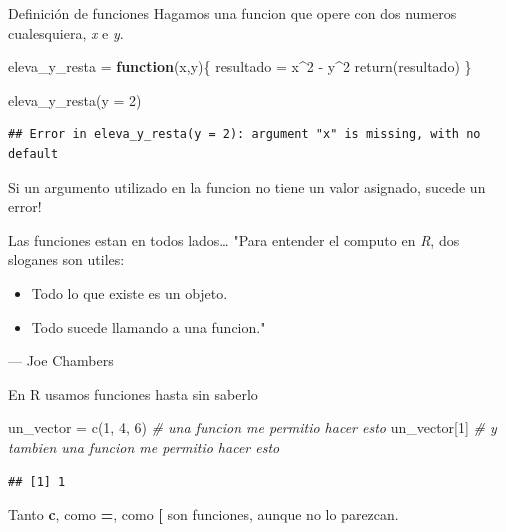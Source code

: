 \documentclass[
  10pt,
  ignorenonframetext,
]{beamer}
\newenvironment{Shaded}{\begin{snugshade}}{\end{snugshade}}
\newcommand{\AttributeTok}[1]{\textcolor[rgb]{0.77,0.63,0.00}{#1}}
\newcommand{\CommentTok}[1]{\textcolor[rgb]{0.56,0.35,0.01}{\textit{#1}}}
\newcommand{\ControlFlowTok}[1]{\textcolor[rgb]{0.13,0.29,0.53}{\textbf{#1}}}
\newcommand{\DecValTok}[1]{\textcolor[rgb]{0.00,0.00,0.81}{#1}}
\newcommand{\FunctionTok}[1]{\textcolor[rgb]{0.00,0.00,0.00}{#1}}
\newcommand{\NormalTok}[1]{#1}
\newcommand{\OtherTok}[1]{\textcolor[rgb]{0.56,0.35,0.01}{#1}}
\newcommand{\SpecialCharTok}[1]{\textcolor[rgb]{0.00,0.00,0.00}{#1}}
\begin{document}
\begin{frame}[fragile]{Definición de funciones}
\protect\hypertarget{definiciuxf3n-de-funciones-4}{}
Hagamos una funcion que opere con dos numeros cualesquiera, \emph{x} e
\emph{y}. \vspace{15pt}

\begin{Shaded}
\begin{Highlighting}[]
\NormalTok{eleva\_y\_resta }\OtherTok{=} \ControlFlowTok{function}\NormalTok{(x,y)\{}
\NormalTok{  resultado }\OtherTok{=}\NormalTok{ x}\SpecialCharTok{\^{}}\DecValTok{2} \SpecialCharTok{{-}}\NormalTok{ y}\SpecialCharTok{\^{}}\DecValTok{2}
  \FunctionTok{return}\NormalTok{(resultado)}
\NormalTok{\}}

\FunctionTok{eleva\_y\_resta}\NormalTok{(}\AttributeTok{y =} \DecValTok{2}\NormalTok{)}
\end{Highlighting}
\end{Shaded}

\begin{verbatim}
## Error in eleva_y_resta(y = 2): argument "x" is missing, with no default
\end{verbatim}

\vspace{15pt}

Si un argumento utilizado en la funcion no tiene un valor asignado,
sucede un error!
\end{frame}

\begin{frame}[fragile]{Las funciones estan en todos lados\ldots{}}
\protect\hypertarget{las-funciones-estan-en-todos-lados}{}
"Para entender el computo en \emph{R}, dos sloganes son utiles:

\begin{itemize}
\item
  Todo lo que existe es un objeto.
\item
  Todo sucede llamando a una funcion."
\end{itemize}

\hfill --- Joe Chambers

\vspace{12pt}

En R usamos funciones hasta sin saberlo

\begin{Shaded}
\begin{Highlighting}[]
\NormalTok{un\_vector }\OtherTok{=} \FunctionTok{c}\NormalTok{(}\DecValTok{1}\NormalTok{, }\DecValTok{4}\NormalTok{, }\DecValTok{6}\NormalTok{) }\CommentTok{\# una funcion me permitio hacer esto}
\NormalTok{un\_vector[}\DecValTok{1}\NormalTok{] }\CommentTok{\# y tambien una funcion me permitio hacer esto}
\end{Highlighting}
\end{Shaded}

\begin{verbatim}
## [1] 1
\end{verbatim}

\vspace{12pt}

Tanto \textbf{c}, como \textbf{=}, como \textbf{{[}} son funciones,
aunque no lo parezcan.
\end{frame}
\end{document}
